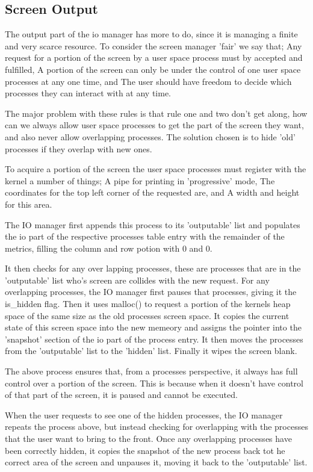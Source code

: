 \documentclass[a4paper]{report}
\begin{document}
\subsection{Screen Output}

The output part of the io manager has more to do, since it is managing a finite and very scarce resource. To consider the screen manager 'fair' we say that; Any request for a portion of the screen by a user space process must by accepted and fulfilled, A portion of the screen can only be under the control of one user space processes at any one time, and The user should have freedom to decide which processes they can interact with at any time.

The major problem with these rules is that rule one and two don't get along, how can we always allow user space processes to get the part of the screen they want, and also never allow overlapping processes. The solution chosen is to hide 'old' processes if they overlap with new ones.

To acquire a portion of the screen the user space processes must register with the kernel a number of things; A pipe for printing in 'progressive' mode, The coordinates for the top left corner of the requested are, and A width and height for this area.

The IO manager first appends this process to its 'outputable' list and populates the io part of the respective processes table entry with the remainder of the metrics, filling the column and row potion with 0 and 0.

It then checks for any over lapping processes, these are processes that are in the 'outputable' list who's screen are collides with the new request. For any overlapping processes, the IO manager first pauses that processes, giving it the is_hidden flag. Then it uses malloc() to request a portion of the kernels heap space of the same size as the old processes screen space. It copies the current state of this screen space into the new memeory and assigns the pointer into the 'snapshot' section of the io part of the process entry. It then moves the processes from the 'outputable' list to the 'hidden' list. Finally it wipes the screen blank.

The above process ensures that, from a processes perspective, it always has full control over a portion of the screen. This is because when it doesn't have control of that part of the screen, it is paused and cannot be executed.

When the user requests to see one of the hidden processes, the IO manager repeats the process above, but instead checking for overlapping with the processes that the user want to bring to the front. Once any overlapping processes have been correctly hidden, it copies the snapshot of the new process back tot he correct area of the screen and unpauses it, moving it back to the 'outputable' list.
\end{document}
